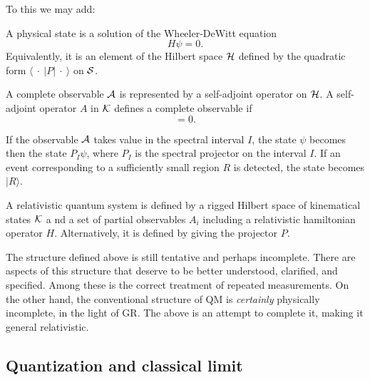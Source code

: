 \documentclass[10pt,nofootinbib]{revtex4}
\begin{document}
To this we may add: 
 \begin{description} 
\addtolength{\itemsep}{-.1cm}
 \item[\rm\em States.]  A physical state is a solution of the
Wheeler-DeWitt equation 
\begin{equation}
H\psi=0.
\label{WdWeq}
\end{equation}
Equivalently, it is an element of the Hilbert space $\cal H$ defined
by the quadratic form $\langle \ \cdot\ |P| \ \cdot\ \rangle$ on $\cal
S$.  

\item[\rm\em Complete observables.]  A complete observable $\cal A$ is
represented by a self-adjoint operator on $\cal H$.  A self-adjoint
operator $A$ in $\cal K$ defines a complete observable if
\begin{equation}
[A,H]=0. 
\end{equation}

\item[\rm\em Projection.]  If the observable $\cal A$ takes value in
the spectral interval $I$, the state $\psi$ becomes then the state
$P_{I}\psi$, where $P_I$ is the spectral projector on the interval
$I$.  If an event corresponding to a sufficiently small region $R$ is
detected, the state becomes $|R\rangle$.
\end{description} 

A relativistic quantum system is defined by a rigged Hilbert space of
kinematical states $\cal K$ a
 nd a set of partial observables $A_{i}$
including a relativistic hamiltonian operator $H$.  Alternatively, it
is defined by giving the projector $P$.
 
The
structure defined above is still tentative and perhaps incomplete. 
There are aspects of this structure that deserve to be better
understood, clarified, and specified.  Among these is the correct 
treatment of repeated
measurements.  On the other hand, the conventional structure of QM is
\emph{certainly} physically incomplete, in the light of GR. The above
is an attempt to complete it, making it general relativistic.

\subsection{Quantization and classical limit}
\end{document}

